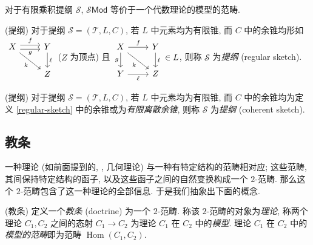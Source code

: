 对于有限乘积提纲 $\mathscr S$, $\mathscr S\mathsf {Mod}$ 等价于一个代数理论的模型的范畴.

\begin{definition}
	[label={regular-sketch}]
	{(\regular{}提纲)}
	对于提纲 $\mathscr S=(\mathcal T,L,C)$, 若 $L$ 中元素均为有限锥, 而 $C$ 中的余锥均形如
	$\begin{tikzcd}[ampersand replacement=\&]
		X \& Y \\
		\& Z
		\arrow["f", shift left, from=1-1, to=1-2]
		\arrow["g"', shift right, from=1-1, to=1-2]
		\arrow["k"', from=1-1, to=2-2]
		\arrow["\ell", from=1-2, to=2-2]
	\end{tikzcd}$
	($Z$ 为顶点) 且
	$\begin{tikzcd}[ampersand replacement=\&]
		X \& Y \\
		Y \& Z
		\arrow["f", from=1-1, to=1-2]
		\arrow["g"', from=1-1, to=2-1]
		\arrow["k"', from=1-1, to=2-2]
		\arrow["\ell", from=1-2, to=2-2]
		\arrow["\ell"', from=2-1, to=2-2]
	\end{tikzcd}\in L$,
	则称 $\mathscr S$ 为\emph{\regular{}提纲} (regular sketch).
\end{definition}

\begin{definition}
	{(\coherent{}提纲)}
	对于提纲 $\mathscr S=(\mathcal T,L,C)$, 若 $L$ 中元素均为有限锥, 而 $C$ 中的余锥均为定义 \ref{regular-sketch} 中的余锥或为\emph{有限离散余锥}, 则称 $\mathscr S$ 为\emph{\coherent{}提纲} (coherent sketch).
\end{definition}

\subsection{教条}

一种理论 (如前面提到的\regular{}, \coherent{}, 几何理论) 与一种有特定结构的范畴相对应; 这些范畴, 其间保持特定结构的函子, 以及这些函子之间的自然变换构成一个 $2$-范畴. 那么这个 $2$-范畴包含了这一种理论的全部信息. 于是我们抽象出下面的概念.

\begin{definition}
	[label={definition-doctrine}]
	{(教条)}
	定义一个\emph{教条}\footnotemark{} (doctrine) 为一个 $2$-范畴. 称该 $2$-范畴的对象为\emph{理论}, 称两个理论 $C_1,C_2$ 之间的态射 $C_1\to C_2$ 为理论 $C_1$ 在 $C_2$ 中的\emph{模型}. 理论 $C_1$ 在 $C_2$ 中的\emph{模型的范畴}即为范畴 $\operatorname{Hom}(C_1,C_2)$.
\end{definition}

